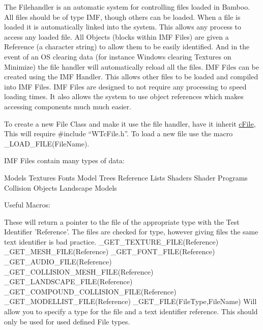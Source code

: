 The Filehandler is an automatic system for controlling files loaded in Bamboo. All files should be of type IMF, though others can be loaded. When a file is loaded it is automatically linked into the system. This allows any process to access any loaded file. All Objects (blocks within IMF Files) are given a Reference (a character string) to allow them to be easily identified. And in the event of an OS clearing data (for instance Windows clearing Textures on Minimize) the file handler will automatically reload all the files. IMF Files can be created using the IMF Handler. This allows other files to be loaded and compiled into IMF Files. IMF Files are designed to not require any processing to speed loading times. It also allows the system to use object references which makes accessing components much much easier.

To create a new File Class and make it use the file handler, have it inherit \hyperlink{classc_file}{cFile}, This will require \#include “WTcFile.h”. To load a new file use the macro \_\-LOAD\_\-FILE(FileName).

IMF Files contain many types of data:

Models Textures Fonts Model Trees Reference Lists Shaders Shader Programs Collision Objects Landscape Models

Useful Macros:

These will return a pointer to the file of the appropriate type with the Test Identifier 'Reference'. The files are checked for type, however giving files the same text identifier is bad practice. \_\-GET\_\-TEXTURE\_\-FILE(Reference) \_\-GET\_\-MESH\_\-FILE(Reference) \_\-GET\_\-FONT\_\-FILE(Reference) \_\-GET\_\-AUDIO\_\-FILE(Reference) \_\-GET\_\-COLLISION\_\-MESH\_\-FILE(Reference) \_\-GET\_\-LANDSCAPE\_\-FILE(Reference) \_\-GET\_\-COMPOUND\_\-COLLISION\_\-FILE(Reference) \_\-GET\_\-MODELLIST\_\-FILE(Reference) \_\-GET\_\-FILE(FileType,FileName) Will allow you to specify a type for the file and a text identifier reference. This should only be used for used defined File types.

